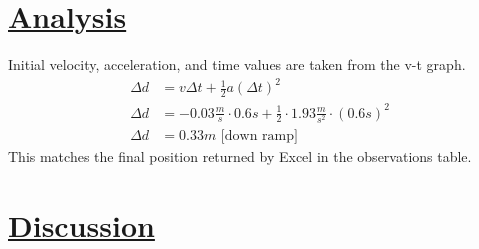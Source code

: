 \documentclass[letterpaper,12pt]{article}
\begin{document}
\section*{\underline{Analysis}}
Initial velocity, acceleration, and time values are taken from the v-t graph.
\begin{align*}
    \Delta d&=v\Delta t+\frac{1}{2}a(\Delta t)^2\\
    \Delta d&=-0.03\frac{m}{s}\cdot0.6s+\frac{1}{2}\cdot1.93\frac{m}{s^2}\cdot(0.6s)^2\\
    \Delta d&=0.33m\text{ [down ramp]}
\end{align*}
This matches the final position returned by Excel in the observations table.

\section*{\underline{Discussion}}
\end{document}
